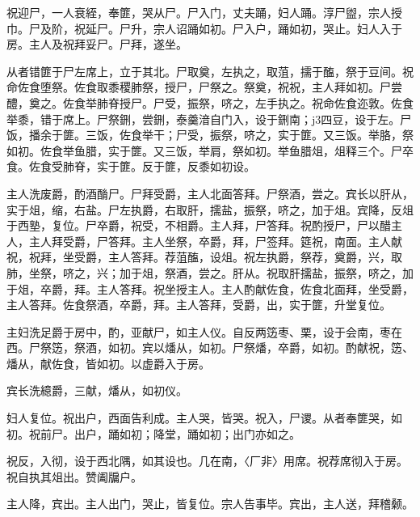\documentclass[]{article}
\begin{document}
祝迎尸，一人衰絰，奉篚，哭从尸。尸入门，丈夫踊，妇人踊。淳尸盥，宗人授巾。尸及阶，祝延尸。尸升，宗人诏踊如初。尸入户，踊如初，哭止。妇人入于房。主人及祝拜妥尸。尸拜，遂坐。

从者错篚于尸左席上，立于其北。尸取奠，左执之，取菹，擩于醢，祭于豆间。祝命佐食堕祭。佐食取黍稷肺祭，授尸，尸祭之。祭奠，祝祝，主人拜如初。尸尝醴，奠之。佐食举肺脊授尸。尸受，振祭，哜之，左手执之。祝命佐食迩敦。佐食举黍，错于席上。尸祭鉶，尝鉶，泰羹湆自门入，设于鉶南；j3四豆，设于左。尸饭，播余于篚。三饭，佐食举干；尸受，振祭，哜之，实于篚。又三饭。举胳，祭如初。佐食举鱼腊，实于篚。又三饭，举肩，祭如初。举鱼腊俎，俎释三个。尸卒食。佐食受肺脊，实于篚。反于篚，反黍如初设。

主人洗废爵，酌酒酳尸。尸拜受爵，主人北面答拜。尸祭酒，尝之。宾长以肝从，实于俎，缩，右盐。尸左执爵，右取肝，擩盐，振祭，哜之，加于俎。宾降，反俎于西塾，复位。尸卒爵，祝受，不相爵。主人拜，尸答拜。祝酌授尸，尸以醋主人，主人拜受爵，尸答拜。主人坐祭，卒爵，拜，尸签拜。筵祝，南面。主人献祝，祝拜，坐受爵，主人答拜。荐菹醢，设俎。祝左执爵，祭荐，奠爵，兴，取肺，坐祭，哜之，兴；加于俎，祭酒，尝之。肝从。祝取肝擩盐，振祭，哜之，加于俎，卒爵，拜。主人答拜。祝坐授主人。主人酌献佐食，佐食北面拜，坐受爵，主人答拜。佐食祭酒，卒爵，拜。主人答拜，受爵，出，实于篚，升堂复位。

主妇洗足爵于房中，酌，亚献尸，如主人仪。自反两笾枣、栗，设于会南，枣在西。尸祭笾，祭酒，如初。宾以燔从，如初。尸祭燔，卒爵，如初。酌献祝，笾、燔从，献佐食，皆如初。以虚爵入于房。

宾长洗繶爵，三献，燔从，如初仪。

妇人复位。祝出户，西面告利成。主人哭，皆哭。祝入，尸谡。从者奉篚哭，如初。祝前尸。出户，踊如初；降堂，踊如初；出门亦如之。

祝反，入彻，设于西北隅，如其设也。几在南，〈厂非〉用席。祝荐席彻入于房。祝自执其俎出。赞阖牖户。

主人降，宾出。主人出门，哭止，皆复位。宗人告事毕。宾出，主人送，拜稽颡。
\end{document}
